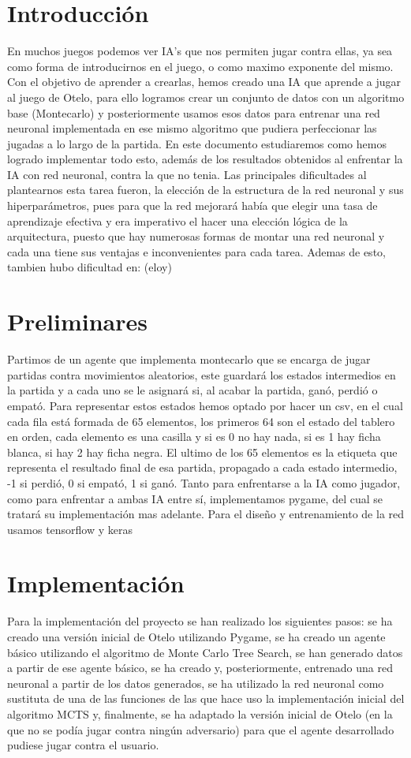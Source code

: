 \documentclass[conference]{IEEEtran}
\begin{document}
\section{Introducción}
En muchos juegos podemos ver IA's que nos permiten jugar contra ellas, ya sea como forma de introducirnos en el juego, o como maximo exponente del mismo.
Con el objetivo de aprender a crearlas, hemos creado una IA que aprende a jugar al juego de Otelo, para ello logramos crear un conjunto de datos con un
algoritmo base (Montecarlo) y posteriormente usamos esos datos para entrenar una red neuronal implementada en ese mismo algoritmo que pudiera perfeccionar las jugadas a lo largo de la 
partida. En este documento estudiaremos como hemos logrado implementar todo esto, además de los resultados obtenidos al enfrentar la IA con red neuronal,
contra la que no tenia. Las principales dificultades al plantearnos esta tarea fueron, la elección de la estructura de la red neuronal y sus hiperparámetros, pues para
que la red mejorará había que elegir una tasa de aprendizaje efectiva y era imperativo el hacer una elección lógica de la arquitectura, puesto que hay numerosas
formas de montar una red neuronal y cada una tiene sus ventajas e inconvenientes para cada tarea. Ademas de esto, tambien hubo dificultad en: (eloy)
\section{Preliminares}
Partimos de un agente que implementa montecarlo que se encarga de jugar partidas contra movimientos aleatorios, este guardará los estados intermedios 
en la partida y a cada uno se le asignará si, al acabar la partida, ganó, perdió o empató. Para representar estos estados hemos optado por hacer un csv, 
en el cual cada fila está formada de 65 elementos, los primeros 64 son el estado del tablero en orden, cada elemento es una casilla y si es 0 no hay nada,
si es 1 hay ficha blanca, si hay 2 hay ficha negra. El ultimo de los 65 elementos es la etiqueta que representa el resultado final de esa partida, propagado a cada estado intermedio,
-1 si perdió, 0 si empató, 1 si ganó. Tanto para enfrentarse a la IA como jugador, como para enfrentar a ambas IA entre sí, implementamos pygame, del cual se tratará su implementación mas adelante.
Para el diseño y entrenamiento de la red usamos tensorflow y keras 

\section{Implementación}
Para la implementación del proyecto se han realizado los siguientes pasos: se ha creado una versión inicial de Otelo utilizando Pygame, se ha creado un agente básico utilizando el algoritmo de Monte Carlo Tree Search, se han generado datos a partir de ese agente básico, se ha creado y, posteriormente, entrenado una red neuronal a partir de los datos generados, se ha utilizado la red neuronal como sustituta de una de las funciones de las que hace uso la implementación inicial del algoritmo MCTS y, finalmente, se ha adaptado la versión inicial de Otelo (en la que no se podía jugar contra ningún adversario) para que el agente desarrollado pudiese jugar contra el usuario.
\end{document}
